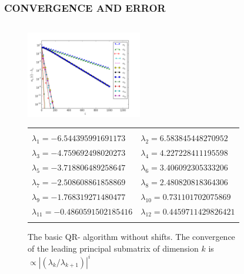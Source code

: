 \documentclass[a4paper,8pt]{beamer} %
\begin{document}
\begin{frame}
\frametitle{CONVERGENCE AND ERROR}
\begin{columns}
%
\column{6cm}
\begin{figure}%
\begin{center}
\includegraphics[height=3.8cm]{12x12randn_eigv_conv_QRstandard.png}
	\begin{scriptsize}
	\begin{tabular}{ll}
		\hline
		\hline
		\\
		$\lambda_1=
		-6.544395991691173
		$ & $\lambda_2=
		6.583845448270952
		$ \\ $\lambda_3=
		-4.759692498020273
		$ & $\lambda_4=
		4.227228411195598
		$ \\ $\lambda_5=
		-3.718806489258647
		$ & $\lambda_6=
		3.406092305333206
		$ \\ $\lambda_7=
		-2.508608861858869
		$ & $\lambda_8=
		2.480820818364306
		$ \\ $\lambda_9=
		-1.768319271480477
		$ & $\lambda_{10}=
		0.731101702075869
		$ \\ $\lambda_{11}=
		-0.4860591502185416
		$ & $\lambda_{12}=
		0.4459711429826421
		$ \\
		\\
		\hline
		\hline
	\end{tabular}
	\end{scriptsize}
\caption{
	The basic QR- algorithm without shifts. The convergence of the leading principal submatrix
	of dimension $k$ is $\propto |(\lambda_k/\lambda_{k+1})|^i$
}
\end{center}
\end{figure}
%
%
%
\column{6cm}
%
\begin{figure}
\begin{center}
\includegraphics[height=3.8cm]{12x12randn_eigv_conv_QRfull.png}

\end{center}
\end{figure}
\end{columns}
\end{frame}
\end{document}

